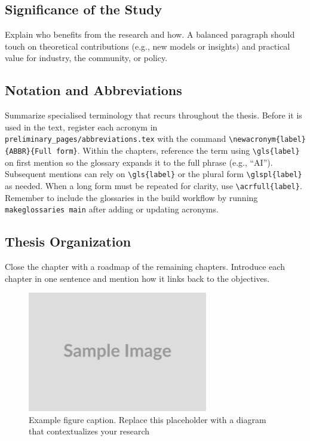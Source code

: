 \subsection{Significance of the Study}
Explain who benefits from the research and how. A balanced paragraph should
touch on theoretical contributions (e.g., new models or insights) and practical
value for industry, the community, or policy.

\subsection{Notation and Abbreviations}
Summarize specialised terminology that recurs throughout the thesis. Before it
is used in the text, register each acronym in
\verb|preliminary_pages/abbreviations.tex| with the command
\verb|\newacronym{label}{ABBR}{Full form}|. Within the chapters, reference the
term using \verb|\gls{label}| on first mention so the glossary expands it to
the full phrase (e.g., ``\gls{AI}''). Subsequent mentions
can rely on \verb|\gls{label}| or the plural form \verb|\glspl{label}| as
needed. When a long form must be repeated for clarity, use
\verb|\acrfull{label}|. Remember to include the glossaries in the build
workflow by running \verb|makeglossaries main| after adding or updating
acronyms.

\subsection{Thesis Organization}
Close the chapter with a roadmap of the remaining chapters. Introduce each
chapter in one sentence and mention how it links back to the objectives.

\begin{figure}[H]
    \centering
    \includegraphics[width=0.7\textwidth]{figures/Figure.png}
    \caption{Example figure caption. Replace this placeholder with a diagram that
        contextualizes your research}\label{fig:overview}
\end{figure}


